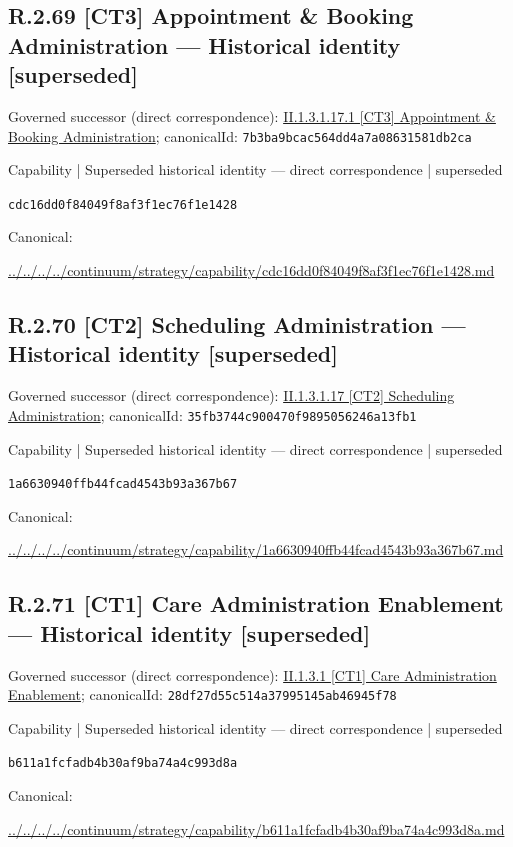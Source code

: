\documentclass[10pt,a4paper]{article}
\begin{document}
\subsection*{R.2.69 [CT3] Appointment \& Booking Administration — Historical identity [superseded]}
Governed successor (direct correspondence): \hyperref[element-7b3ba9bcac564dd4a7a08631581db2ca]{II.1.3.1.17.1 [CT3] Appointment \& Booking Administration}; canonicalId: \texttt{7b3ba9bcac564dd4a7a08631581db2ca}\par
\label{element-cdc16dd0f84049f8af3f1ec76f1e1428}
{\small Capability | Superseded historical identity — direct correspondence | superseded}\par
\texttt{cdc16dd0f84049f8af3f1ec76f1e1428}\par
Canonical: \par
{\footnotesize\url{../../../../continuum/strategy/capability/cdc16dd0f84049f8af3f1ec76f1e1428.md}}\par
\subsection*{R.2.70 [CT2] Scheduling Administration — Historical identity [superseded]}
Governed successor (direct correspondence): \hyperref[element-35fb3744c900470f9895056246a13fb1]{II.1.3.1.17 [CT2] Scheduling Administration}; canonicalId: \texttt{35fb3744c900470f9895056246a13fb1}\par
\label{element-1a6630940ffb44fcad4543b93a367b67}
{\small Capability | Superseded historical identity — direct correspondence | superseded}\par
\texttt{1a6630940ffb44fcad4543b93a367b67}\par
Canonical: \par
{\footnotesize\url{../../../../continuum/strategy/capability/1a6630940ffb44fcad4543b93a367b67.md}}\par
\subsection*{R.2.71 [CT1] Care Administration Enablement — Historical identity [superseded]}
Governed successor (direct correspondence): \hyperref[element-28df27d55c514a37995145ab46945f78]{II.1.3.1 [CT1] Care Administration Enablement}; canonicalId: \texttt{28df27d55c514a37995145ab46945f78}\par
\label{element-b611a1fcfadb4b30af9ba74a4c993d8a}
{\small Capability | Superseded historical identity — direct correspondence | superseded}\par
\texttt{b611a1fcfadb4b30af9ba74a4c993d8a}\par
Canonical: \par
{\footnotesize\url{../../../../continuum/strategy/capability/b611a1fcfadb4b30af9ba74a4c993d8a.md}}\par
\end{document}
